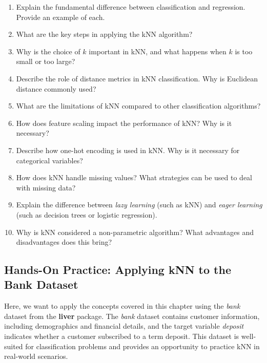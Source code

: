 \documentclass[
  11pt,
]{book}
\providecommand{\tightlist}{%
  \setlength{\itemsep}{0pt}\setlength{\parskip}{0pt}}
\theoremstyle{definition}
\theoremstyle{definition}
\theoremstyle{definition}
\theoremstyle{definition}
\theoremstyle{remark}
\begin{document}
\begin{enumerate}
\def\labelenumi{\arabic{enumi}.}
\tightlist
\item
  Explain the fundamental difference between classification and regression. Provide an example of each.\\
\item
  What are the key steps in applying the kNN algorithm?\\
\item
  Why is the choice of \(k\) important in kNN, and what happens when \(k\) is too small or too large?\\
\item
  Describe the role of distance metrics in kNN classification. Why is Euclidean distance commonly used?\\
\item
  What are the limitations of kNN compared to other classification algorithms?\\
\item
  How does feature scaling impact the performance of kNN? Why is it necessary?\\
\item
  Describe how one-hot encoding is used in kNN. Why is it necessary for categorical variables?\\
\item
  How does kNN handle missing values? What strategies can be used to deal with missing data?\\
\item
  Explain the difference between \emph{lazy learning} (such as kNN) and \emph{eager learning} (such as decision trees or logistic regression).\\
\item
  Why is kNN considered a non-parametric algorithm? What advantages and disadvantages does this bring?
\end{enumerate}

\subsection*{Hands-On Practice: Applying kNN to the Bank Dataset}\label{hands-on-practice-applying-knn-to-the-bank-dataset}


Here, we want to apply the concepts covered in this chapter using the \emph{bank} dataset from the \textbf{liver} package. The \emph{bank} dataset contains customer information, including demographics and financial details, and the target variable \emph{deposit} indicates whether a customer subscribed to a term deposit. This dataset is well-suited for classification problems and provides an opportunity to practice kNN in real-world scenarios.
\end{document}
